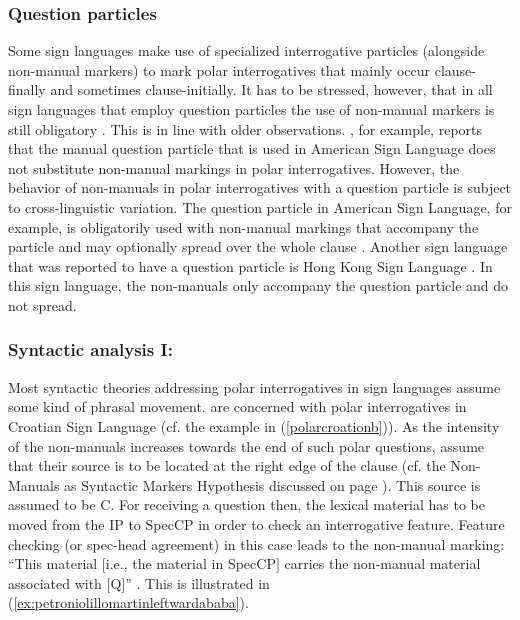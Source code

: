\subsubsection{Question particles}
Some sign languages make use of specialized interrogative particles (alongside non-manual markers) to mark polar interrogatives that mainly occur clause-finally and sometimes clause-initially. It has to be stressed, however, that in all sign languages that employ question particles the use of non-manual markers is still obligatory \citep[21]{zeshan2004interrogative}. This is in line with older observations. \citet{liddell1977non}, for example, reports that the manual question particle that is used in American Sign Language does not substitute non-manual markings in polar interrogatives. However, the behavior of non-manuals in polar interrogatives with a question particle is subject to cross-linguistic variation. The question particle in American Sign Language, for example, is obligatorily used with non-manual markings that accompany the particle and may optionally spread over the  whole clause \citep[122--124]{neidle2000syntax}. Another sign language that was reported to have a question particle is Hong Kong Sign Language \citep[206]{tang2006questions}. In this sign language, the non-manuals only accompany the question particle and do not spread. 

\subsubsection{Syntactic analysis I: \citet{sarac2006interrogative}}
Most syntactic theories addressing polar interrogatives in sign languages assume some kind of phrasal movement. \citet{sarac2006interrogative} are concerned with polar interrogatives in Croatian Sign Language (cf. the example in (\ref{polarcroationb})). 
As the intensity of the non-manuals increases towards the end of such polar questions, \citet{sarac2006interrogative} assume that their source is to be located at the right edge of the clause (cf. the Non-Manuals as Syntactic Markers Hypothesis discussed on page \pageref{nmasmh}). This source is assumed to be C\textdegree . For receiving a question then, the lexical material has to be moved from the IP to SpecCP in order to check an interrogative feature. Feature checking (or spec-head agreement) in this case leads to the non-manual marking: ``This material $[$i.e., the material in SpecCP$]$ carries the non-manual material associated with $[$Q$]$'' \citep[222]{sarac2006interrogative}. This is illustrated in (\ref{ex:petroniolillomartinleftwardababa}).


